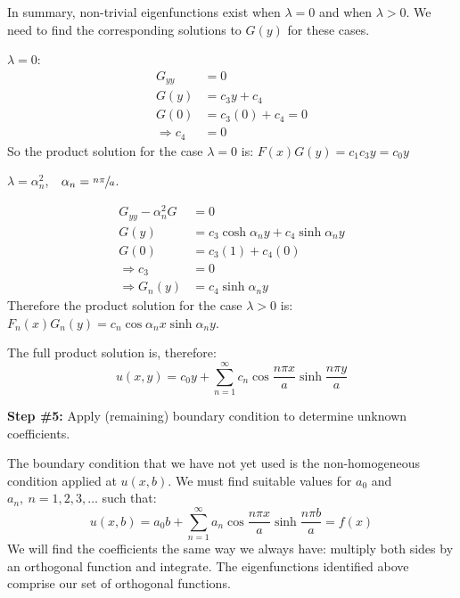 \vspace{0.25cm}

\noindent In summary, non-trivial eigenfunctions exist when $\lambda = 0$ and when $\lambda >0$.  We need to find the corresponding solutions to $G(y)$ for these cases.

\vspace{0.1cm}

\noindent\underline{$\lambda = 0$}: 
\begin{align*}
G_{yy} &= 0 \\
G(y) &= c_3y + c_4 \\
G(0) &= c_3(0) + c_4 = 0 \\
\Rightarrow c_4 &= 0
\end{align*} 
So the product solution for the case $\lambda = 0$ is: $F(x)G(y) = c_1 c_3y = c_0y$

\vspace{0.25cm}

\noindent\underline{$\lambda = \alpha_n^2$}, $\ \ \alpha_n = \sfrac{n \pi}{a}$.

\begin{align*}
G_{yy} - \alpha_n^2 G &= 0 \\
G(y) &= c_3 \cosh{\alpha_n y} + c_4 \sinh{\alpha_n y} \\
G(0) &= c_3 (1) + c_4(0) \\
\Rightarrow c_3 &= 0 \\
\Rightarrow G_n(y) &= c_4 \sinh{\alpha_n y}
\end{align*}
Therefore the product solution for the case $\lambda > 0$ is: $F_n(x)G_n(y) = c_n \cos{\alpha_n x} \sinh{\alpha_n y}$.

\vspace{0.25cm}

\noindent The full product solution is, therefore:
\begin{equation*}
u(x,y) = c_0y + \sum\limits_{n=1}^{\infty} c_n \cos{\frac{n \pi x}{a}} \sinh{\frac{n \pi y}{a}}
\end{equation*}

\vspace{3.0cm}

\noindent\textbf{Step \#5:} Apply (remaining) boundary condition to determine unknown coefficients.

\vspace{0.25cm}

\noindent The boundary condition that we have not yet used is the non-homogeneous condition applied at $u(x,b)$.  We must find suitable values for $a_0$ and $a_n, \ n=1,2,3,\dots$ such that:
\begin{equation*}
u(x,b) = a_0b + \sum\limits_{n=1}^{\infty}a_n \cos{\frac{n \pi x}{a}}\sinh{\frac{n \pi b}{a}} = f(x)
\end{equation*}
We will find the coefficients the same way we always have: multiply both sides by an orthogonal function and integrate.  The eigenfunctions identified above comprise our set of orthogonal functions.

